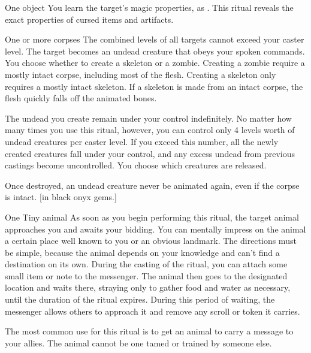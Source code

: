 \begin{spelltarget}{One object}
    \spelleffect You learn the target's magic properties, as . This ritual reveals the exact properties of cursed items and artifacts.
\end{spelltarget}

\begin{spelltarget}{One or more corpses}
    \spellspecial The combined levels of all targets cannot exceed your caster level.
    \spelleffect The target becomes an undead creature that obeys your spoken commands. You choose whether to create a skeleton or a zombie. Creating a zombie require a mostly intact corpse, including most of the flesh. Creating a skeleton only requires a mostly intact skeleton. If a skeleton is made from an intact corpse, the flesh quickly falls off the animated bones.
\end{spelltarget}
\spellnotes The undead you create remain under your control indefinitely. No matter how many times you use this ritual, however, you can control only 4 levels worth of undead creatures per caster level. If you exceed this number, all the newly created creatures fall under your control, and any excess undead from previous castings become uncontrolled. You choose which creatures are released.

Once destroyed, an undead creature never be animated again, even if the corpse is intact.
[in black onyx gems.]

\spellrng{\rnglong}
\begin{spelltarget}{One Tiny animal}
    \spelleffect As soon as you begin performing this ritual, the target animal approaches you and awaits your bidding. You can mentally impress on the animal a certain place well known to you or an obvious landmark. The directions must be simple, because the animal depends on your knowledge and can't find a destination on its own. During the casting of the ritual, you can attach some small item or note to the messenger. The animal then goes to the designated location and waits there, straying only to gather food and water as necessary, until the duration of the ritual expires. During this period of waiting, the messenger allows others to approach it and remove any scroll or token it carries.
\end{spelltarget}
\spellnotes The most common use for this ritual is to get an animal to carry a message to your allies. The animal cannot be one tamed or trained by someone else.


